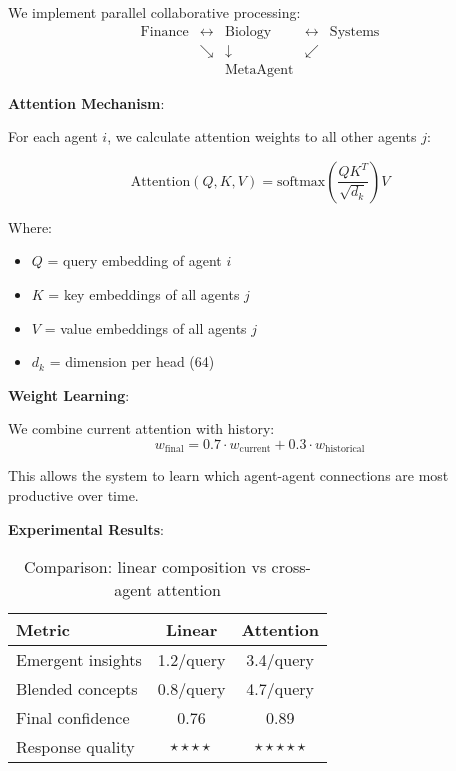 \documentclass[11pt]{article}
\begin{document}
We implement parallel collaborative processing:
\begin{equation}
\begin{matrix}
\text{Finance} & \leftrightarrow & \text{Biology} & \leftrightarrow & \text{Systems} \\
& \searrow & \downarrow & \swarrow & \\
& & \text{MetaAgent} & &
\end{matrix}
\end{equation}

\textbf{Attention Mechanism}:

For each agent $i$, we calculate attention weights to all other agents $j$:

\begin{equation}
\text{Attention}(Q, K, V) = \text{softmax}\left(\frac{QK^T}{\sqrt{d_k}}\right)V
\end{equation}

Where:
\begin{itemize}
    \item $Q$ = query embedding of agent $i$
    \item $K$ = key embeddings of all agents $j$
    \item $V$ = value embeddings of all agents $j$
    \item $d_k$ = dimension per head (64)
\end{itemize}

\textbf{Weight Learning}:

We combine current attention with history:
\begin{equation}
w_{\text{final}} = 0.7 \cdot w_{\text{current}} + 0.3 \cdot w_{\text{historical}}
\end{equation}

This allows the system to learn which agent-agent connections are most productive over time.

\textbf{Experimental Results}:

\begin{table}[H]
\centering
\begin{tabular}{@{}lcc@{}}
\toprule
\textbf{Metric} & \textbf{Linear} & \textbf{Attention} \\ \midrule
Emergent insights & 1.2/query & 3.4/query \\
Blended concepts & 0.8/query & 4.7/query \\
Final confidence & 0.76 & 0.89 \\
Response quality & $\star\star\star\star$ & $\star\star\star\star\star$ \\
\bottomrule
\end{tabular}
\caption{Comparison: linear composition vs cross-agent attention}
\end{table}
\end{document}

